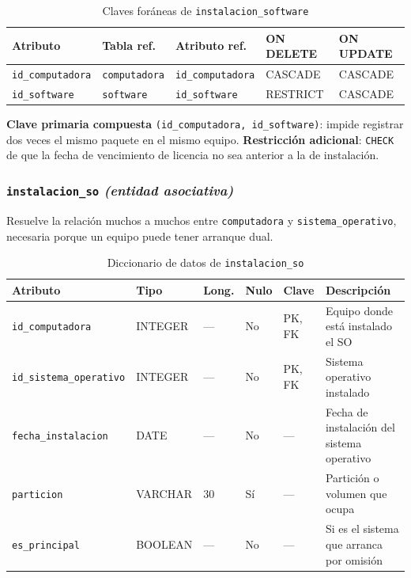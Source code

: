 \documentclass[10pt,a4paper]{article}
\begin{document}
\begin{table}[H]
	\centering
	\footnotesize
	\begin{tabular}{p{3.6cm} | p{3.4cm} | p{3.4cm} | p{1.5cm} | p{1.5cm}}\hline \hline
		\textbf{Atributo} & \textbf{Tabla ref.} & \textbf{Atributo ref.} & \textbf{ON DELETE} & \textbf{ON UPDATE} \\ \hline \hline
		\texttt{id\_computadora} & \texttt{computadora} & \texttt{id\_computadora} & CASCADE & CASCADE \\ \hline
		\texttt{id\_software} & \texttt{software} & \texttt{id\_software} & RESTRICT & CASCADE \\ \hline \hline
	\end{tabular}
	\caption{Claves foráneas de \texttt{instalacion\_software}}
	\label{tabla:fk-instsw}
\end{table}

\textbf{Clave primaria compuesta} \texttt{(id\_computadora, id\_software)}: impide registrar dos veces el mismo paquete en el mismo equipo. \textbf{Restricción adicional}: \texttt{CHECK} de que la fecha de vencimiento de licencia no sea anterior a la de instalación.

\subsubsection{\texttt{instalacion\_so} \textit{(entidad asociativa)}}

Resuelve la relación muchos a muchos entre \texttt{computadora} y \texttt{sistema\_operativo}, necesaria porque un equipo puede tener arranque dual.

\begin{table}[H]
	\centering
	\footnotesize
	\begin{tabular}{p{3.4cm} | p{1.6cm} | p{0.8cm} | p{0.7cm} | p{1.3cm} | p{6.4cm}}\hline \hline
		\textbf{Atributo} & \textbf{Tipo} & \textbf{Long.} & \textbf{Nulo} & \textbf{Clave} & \textbf{Descripción} \\ \hline \hline
		\texttt{id\_computadora} & INTEGER & --- & No & PK, FK & Equipo donde está instalado el SO \\ \hline
		\texttt{id\_sistema\_operativo} & INTEGER & --- & No & PK, FK & Sistema operativo instalado \\ \hline
		\texttt{fecha\_instalacion} & DATE & --- & No & --- & Fecha de instalación del sistema operativo \\ \hline
		\texttt{particion} & VARCHAR & 30 & Sí & --- & Partición o volumen que ocupa \\ \hline
		\texttt{es\_principal} & BOOLEAN & --- & No & --- & Si es el sistema que arranca por omisión \\ \hline \hline
	\end{tabular}
	\caption{Diccionario de datos de \texttt{instalacion\_so}}
	\label{tabla:dic-instso}
\end{table}
\end{document}
